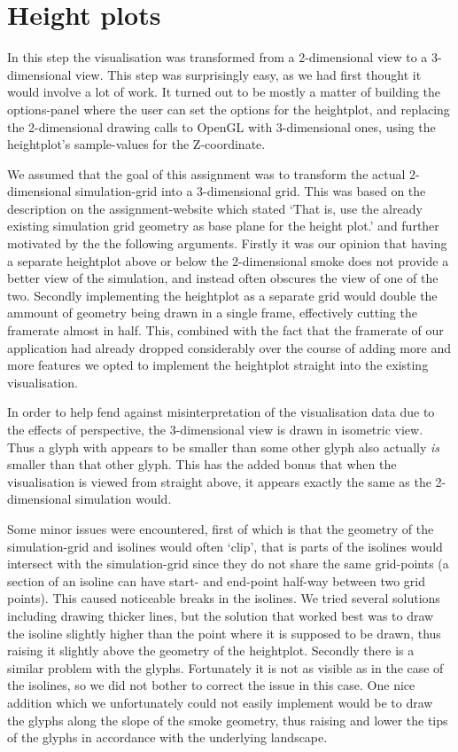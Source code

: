 \documentclass[a4paper,11pt,twoside]{report}
\begin{document}
	\section{Height plots}
		In this step the visualisation was transformed from a 2-dimensional view to a 3-dimensional view. This step was surprisingly easy, as we had first thought it would involve a lot of work. It turned out to be mostly a matter of building the options-panel where the user can set the options for the heightplot, and replacing the 2-dimensional drawing calls to OpenGL with 3-dimensional ones, using the heightplot's sample-values for the Z-coordinate.

		We assumed that the goal of this assignment was to transform the actual 2-dimensional simulation-grid into a 3-dimensional grid. This was based on the description on the assignment-website which stated `That is, use the already existing simulation grid geometry as base plane for the height plot.' and further motivated by the the following arguments. Firstly it was our opinion that having a separate heightplot above or below the 2-dimensional smoke does not provide a better view of the simulation, and instead often obscures the view of one of the two. Secondly implementing the heightplot as a separate grid would double the ammount of geometry being drawn in a single frame, effectively cutting the framerate almost in half. This, combined with the fact that the framerate of our application had already dropped considerably over the course of adding more and more features we opted to implement the heightplot straight into the existing visualisation.

		In order to help fend against misinterpretation of the visualisation data due to the effects of perspective, the 3-dimensional view is drawn in isometric view. Thus a glyph with appears to be smaller than some other glyph also actually \emph{is} smaller than that other glyph. This has the added bonus that when the visualisation is viewed from straight above, it appears exactly the same as the 2-dimensional simulation would.

		Some minor issues were encountered, first of which is that the geometry of the simulation-grid and isolines would often `clip', that is parts of the isolines would intersect with the simulation-grid since they do not share the same grid-points (a section of an isoline can have start- and end-point half-way between two grid points). This caused noticeable breaks in the isolines. We tried several solutions including drawing thicker lines, but the solution that worked best was to draw the isoline slightly higher than the point where it is supposed to be drawn, thus raising it slightly above the geometry of the heightplot.
		Secondly there is a similar problem with the glyphs. Fortunately it is not as visible as in the case of the isolines, so we did not bother to correct the issue in this case. One nice addition which we unfortunately could not easily implement would be to draw the glyphs along the slope of the smoke geometry, thus raising and lower the tips of the glyphs in accordance with the underlying landscape.
\end{document}
